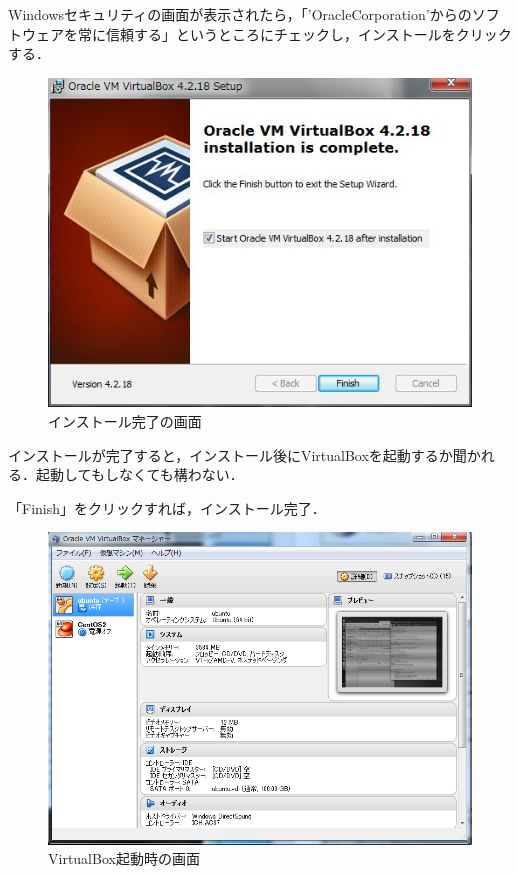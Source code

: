 Windowsセキュリティの画面が表示されたら，「'OracleCorporation'からのソフトウェアを常に信頼する」というところにチェックし，インストールをクリックする．

\begin{figure}[H]
\centering
\includegraphics[width=13cm]{install_finish.jpg}
\caption{インストール完了の画面}\label{サンプル図}
\end{figure}

インストールが完了すると，インストール後にVirtualBoxを起動するか聞かれる．起動してもしなくても構わない．

「Finish」をクリックすれば，インストール完了．


\begin{figure}[H]
\centering
\includegraphics[width=13cm]{VirtualBox_start.png}
\caption{VirtualBox起動時の画面}\label{サンプル図}
\end{figure}

